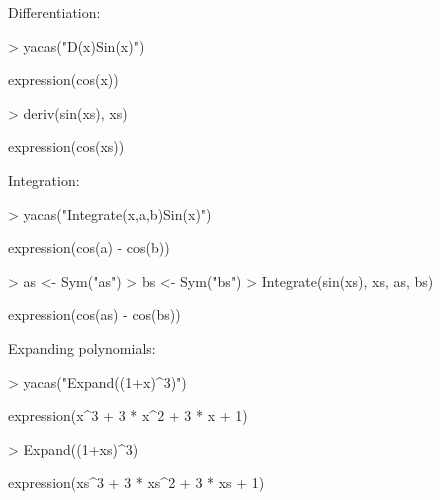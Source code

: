 \documentclass[]{article}
\begin{document}
Differentiation:
\begin{Schunk}
\begin{Sinput}
> yacas("D(x)Sin(x)")
\end{Sinput}
\begin{Soutput}
expression(cos(x))
\end{Soutput}
\end{Schunk}
\begin{Schunk}
\begin{Sinput}
> deriv(sin(xs), xs)
\end{Sinput}
\begin{Soutput}
expression(cos(xs))
\end{Soutput}
\end{Schunk}

Integration: 

\begin{Schunk}
\begin{Sinput}
> yacas("Integrate(x,a,b)Sin(x)")
\end{Sinput}
\begin{Soutput}
expression(cos(a) - cos(b))
\end{Soutput}
\end{Schunk}

\begin{Schunk}
\begin{Sinput}
> as <- Sym("as")
> bs <- Sym("bs")
> Integrate(sin(xs), xs, as, bs)
\end{Sinput}
\begin{Soutput}
expression(cos(as) - cos(bs))
\end{Soutput}
\end{Schunk}


Expanding polynomials:
\begin{Schunk}
\begin{Sinput}
> yacas("Expand((1+x)^3)")
\end{Sinput}
\begin{Soutput}
expression(x^3 + 3 * x^2 + 3 * x + 1)
\end{Soutput}
\end{Schunk}

\begin{Schunk}
\begin{Sinput}
> Expand((1+xs)^3)
\end{Sinput}
\begin{Soutput}
expression(xs^3 + 3 * xs^2 + 3 * xs + 1)
\end{Soutput}
\end{Schunk}
\end{document}
